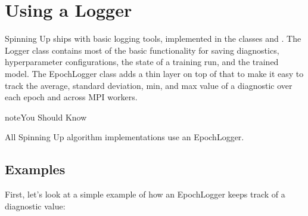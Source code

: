 \documentclass[letterpaper,10pt,english]{sphinxmanual}
\begin{document}
\section{Using a Logger}
\label{\detokenize{utils/logger:using-a-logger}}
Spinning Up ships with basic logging tools, implemented in the classes  and . The Logger class contains most of the basic functionality for saving diagnostics, hyperparameter configurations, the state of a training run, and the trained model. The EpochLogger class adds a thin layer on top of that to make it easy to track the average, standard deviation, min, and max value of a diagnostic over each epoch and across MPI workers.

\begin{sphinxadmonition}{note}{You Should Know}

All Spinning Up algorithm implementations use an EpochLogger.
\end{sphinxadmonition}


\subsection{Examples}
\label{\detokenize{utils/logger:examples}}
First, let’s look at a simple example of how an EpochLogger keeps track of a diagnostic value:
\end{document}
